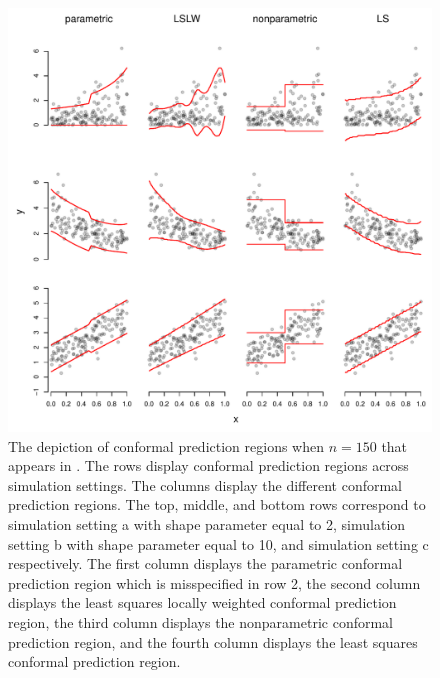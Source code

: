 \documentclass[11pt]{article}\usepackage[]{graphicx}\usepackage[]{color}
\makeatletter
\def\maxwidth{ %
  \ifdim\Gin@nat@width>\linewidth
    \linewidth
  \else
    \Gin@nat@width
  \fi
}
\newenvironment{knitrout}{}{} %
\makeatother
\begin{document}
\newpage
\begin{figure}[h!]
\begin{center}
\begin{knitrout}
\color{fgcolor}
\includegraphics[width=\maxwidth]{figure/conformal-plots-1} 

\end{knitrout}
\end{center}
\caption{The depiction of conformal prediction regions when $n = 150$ that 
  appears in \citet{eck2019conformal}.  The rows display conformal prediction 
  regions across simulation settings.  The columns display the different 
  conformal prediction regions.  The top, middle, and bottom rows correspond 
  to simulation setting a with shape parameter equal to 2, simulation setting 
  b with shape parameter equal to 10, and simulation setting c respectively.  
  The first column displays the parametric conformal prediction region which 
  is misspecified in row 2, the second column displays the least squares 
  locally weighted conformal prediction region, the third column displays the 
  nonparametric conformal prediction region, and the fourth column displays 
  the least squares conformal prediction region.}
\label{conformal-plots}
\end{figure}
\end{document}
